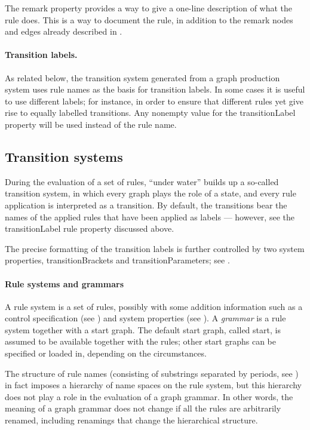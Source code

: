 The \textsf{remark} property provides a way to give a one-line description of
what the rule does. This is a way to document the rule, in addition to the
remark nodes and edges already described in .

\paragraph{Transition labels.}

As related below, the transition system generated from a graph production
system uses rule names as the basis for transition labels. In some cases it is
useful to use different labels; for instance, in order to ensure that different
rules yet give rise to equally labelled transitions. Any nonempty value for the
\textsf{transitionLabel} property will be used instead of the rule name.

\subsection{Transition systems}

During the evaluation of a set of rules, \Groove{} ``under water'' builds up a
so-called transition system, in which every graph plays the role of a state,
and every rule application is interpreted as a transition. By default, the
transitions bear the names of the applied rules that have been applied as
labels --- however, see the \textsf{transitionLabel} rule property discussed
above.

The precise formatting of the transition labels is further controlled by two
system properties, \textsf{transitionBrackets} and
\textsf{transitionParameters}; see .

\paragraph{Rule systems and grammars}

A rule system is a set of rules, possibly with some addition information such
as a control specification (see ) and system properties (see
). A \emph{grammar} is a rule system together with a
start graph. The default start graph, called \textsf{start}, is assumed to be
available together with the rules; other start graphs can be specified or
loaded in, depending on the circumstances.

The structure of rule names (consisting of substrings separated by periods, see
) in fact imposes a hierarchy of name spaces on the rule system,
but this hierarchy does not play a role in the evaluation of a graph grammar.
In other words, the meaning of a graph grammar does not change if all the rules
are arbitrarily renamed, including renamings that change the hierarchical
structure.

